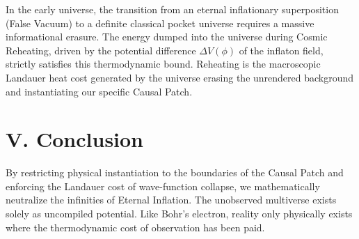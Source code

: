 \documentclass[aps,prd,reprint,superscriptaddress,nofootinbib]{revtex4-2}
\begin{document}
In the early universe, the transition from an eternal inflationary superposition (False Vacuum) to a definite classical pocket universe requires a massive informational erasure. The energy dumped into the universe during Cosmic Reheating, driven by the potential difference $\Delta V(\phi)$ of the inflaton field, strictly satisfies this thermodynamic bound. Reheating is the macroscopic Landauer heat cost generated by the universe erasing the unrendered background and instantiating our specific Causal Patch.

\section{V. Conclusion}

By restricting physical instantiation to the boundaries of the Causal Patch and enforcing the Landauer cost of wave-function collapse, we mathematically neutralize the infinities of Eternal Inflation. The unobserved multiverse exists solely as uncompiled potential. Like Bohr's electron, reality only physically exists where the thermodynamic cost of observation has been paid.
\end{document}

